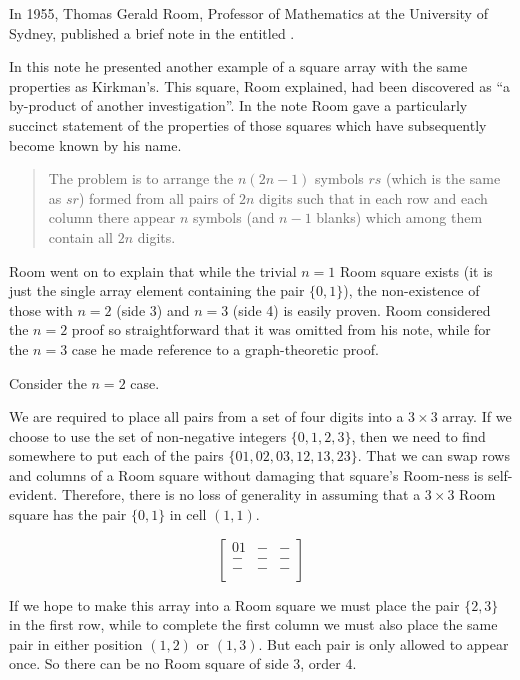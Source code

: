 In 1955, Thomas Gerald Room, Professor of Mathematics at the University of Sydney, published a brief note
\cite{room2569NewType1955}
in the
entitled
.

In this note he presented another example of a square array with the same properties as Kirkman’s.
This square, Room explained, had been discovered as ``a by-product of another investigation''.
In the note Room gave a particularly succinct statement of the properties of those squares which have subsequently become known by his name.

\begin{quotation}
The problem is to arrange the $n(2n - 1)$ symbols $rs$ (which is the same as $sr$) formed from all pairs of $2n$ digits such that in each row and each column there appear $n$ symbols (and $n - 1$ blanks) which among them contain all $2n$ digits.
\end{quotation}

Room went on to explain that while the trivial $n = 1$ Room square exists (it is just the single array element containing the pair $\{0, 1\}$), the non-existence of those with $n = 2$ (side 3) and $n = 3$ (side 4) is easily proven.
Room considered the $n = 2$ proof so straightforward that it was omitted from his note, while for the $n = 3$ case he made reference to a graph-theoretic proof.

Consider the $n = 2$ case.

We are required to place all pairs from a set of four digits into a $3 \times 3$ array.
If we choose to use the set of non-negative integers
$\{0, 1, 2, 3\}$,
then we need to find somewhere to put each of the pairs
$\{01, 02, 03, 12, 13, 23\}$.
That we can swap rows and columns of a Room square without damaging that square's Room-ness is self-evident.
Therefore, there is no loss of generality in assuming that a $3 \times 3$ Room square has the pair $\{0, 1\}$ in cell $(1, 1)$.

\begin{equation}
  \begin{bmatrix}
    01 &  - & - \\
    -   & - & - \\
    -   & - & - \\
  \end{bmatrix}
\end{equation}

If we hope to make this array into a Room square we must place the pair $\{2, 3\}$ in the first row, while to complete the first column we must also place the same pair in either position $(1, 2)$ or $(1, 3)$.
But each pair is only allowed to appear once.
So there can be no Room square of side 3, order 4.

